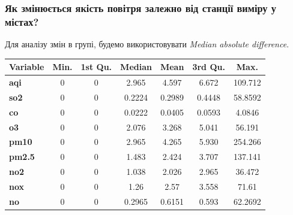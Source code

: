 \documentclass{beamer}
\begin{document}
\begin{frame}
  \frametitle{Як змінюється якість повітря залежно від станції виміру у містах?}

  Для аналізу змін в групі, будемо використовувати \textit{Median absolute difference}.

  \begin{center}
    \begin{tabular}{lcccccc}
      \hline
      \textbf{Variable} & \textbf{Min.} & \textbf{1st Qu.}  & \textbf{Median} & \textbf{Mean} & \textbf{3rd Qu.} & \textbf{Max.} \\
      \hline
      \textbf{aqi}      & 0             & 0                 & 2.965           & 4.597         & 6.672            & 109.712       \\
      \textbf{so2}      & 0             & 0                 & 0.2224          & 0.2989        & 0.4448           & 58.8592       \\
      \textbf{co}       & 0             & 0                 & 0.0222          & 0.0405        & 0.0593           & 4.0846        \\
      \textbf{o3}       & 0             & 0                 & 2.076           & 3.268         & 5.041            & 56.191        \\
      \textbf{pm10}     & 0             & 0                 & 2.965           & 4.265         & 5.930            & 254.266       \\
      \textbf{pm2.5}    & 0             & 0                 & 1.483           & 2.424         & 3.707            & 137.141       \\
      \textbf{no2}      & 0             & 0                 & 1.038           & 2.026         & 2.965            & 36.472        \\
      \textbf{nox}      & 0             & 0                 & 1.26            & 2.57          & 3.558            & 71.61         \\
      \textbf{no}       & 0             & 0                 & 0.2965          & 0.6151        & 0.593            & 62.2692       \\
    \end{tabular}
  \end{center}
\end{frame}
\end{document}
